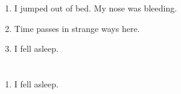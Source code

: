 \documentclass{article}
\begin{document}
    \begin{enumerate}
    
    \item I jumped out of bed. My nose was bleeding.\\
    
    \item Time passes in strange ways here.\\
    
    \item I fell asleep.\\
    
    \end{enumerate}
     
    \newpage
    
    \section{}
    
    \begin{enumerate}
    
    \item I fell asleep.\\
    
    \end{enumerate}
     
    \newpage
    
    \section{}
    
\end{document}
